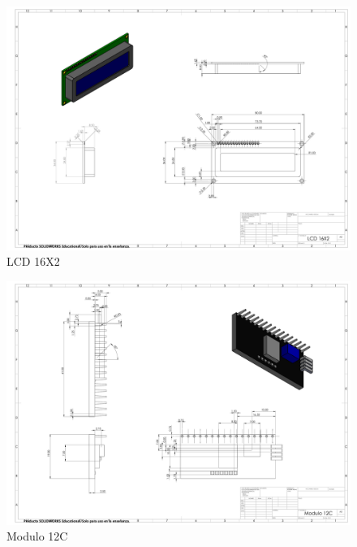     \begin{figure}[H]
        \centering
        \includegraphics[trim = {10mm 10mm 10mm 10mm},clip,scale=0.120]{24/Img/LCD 16X2.pdf}
        \caption{LCD 16X2}
        \label{fig:LCD 16X2}
    \end{figure}
    \begin{figure}[H]
        \centering
        \includegraphics[trim = {10mm 10mm 10mm 10mm},clip,scale=0.120]{24/Img/Modulo 12C.pdf}
        \caption{Modulo 12C}
        \label{fig:Modulo 12C}
    \end{figure}
